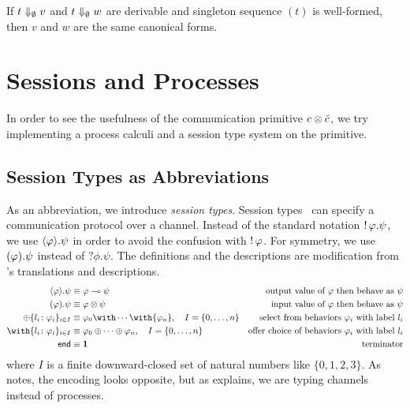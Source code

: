     \begin{corollary}
     If $t\Downarrow_\emptyset v$ and $t\Downarrow_\emptyset w$ are derivable
     and singleton sequence $(t)$ is well-formed, then
     $v$ and $w$ are the same canonical forms.
    \end{corollary}

    \section{Sessions and Processes}
    \label{sec:session-process}

    In order to see the usefulness of the communication primitive
    $c\otimes \bar{c}$,
    we try implementing a process calculi and a session type system on
    the primitive.

    \subsection{Session Types as Abbreviations}

    As an abbreviation, we introduce \textit{session
    types}.
    Session types~\cite{honda-session} can specify a communication
    protocol over a channel.
    Instead of the standard notation $\mathop{!}\varphi.\psi$, we use
    $\langle{\varphi}\rangle.{\psi}$ in order to avoid the confusion with
    $\mathop{!}\varphi$.
    For symmetry, we use $(\varphi).{\psi}$ instead of $?\phi.\psi$.
    The definitions and the descriptions are modification from
    \citet{wadler2012propositions}'s translations and descriptions.
    \begin{align*}
     \sendtype\phi\psi&\equiv \phi\limp\psi &\text{
     output value of $\phi$ then behave as $\psi$} \\
     \recvtype\phi\psi&\equiv \phi\otimes\psi &\text{input value of
     $\phi$ then behave as $\psi$}\\
     \oplus\{l_i\colon \phi_i\}_{i\in I} &\equiv {\phi_0}\with
     \cdots \with {\phi_n}, \quad I = \{0,\ldots,n\} & \text{select from behaviors
     $\phi_i$ with label $l_i$}\\
     \with\{l_i\colon \phi_i\}_{i\in I} &\equiv {\phi_0}\oplus
     \cdots \oplus {\phi_n}, \quad I = \{0,\ldots,n\}& \text{offer choice of
     behaviors $\phi_i$ with label $l_i$}
     \\
     \terminate &\equiv \one &\text{terminator}
    \end{align*}
    where $I$ is a finite downward-closed set of natural numbers like
    $\{0,1,2,3\}$.
    As \citet{wadler2012propositions} notes, the encoding looks
    opposite, but as \citet{wadler2012propositions} explains, we are
    typing channels instead of processes.

